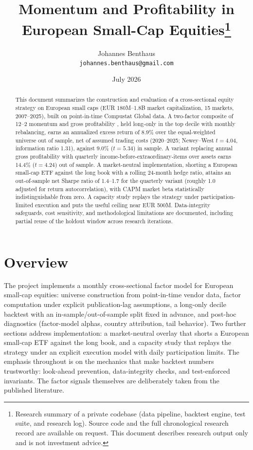 \documentclass[11pt,a4paper]{article}
\title{Momentum and Profitability in European Small-Cap
Equities\thanks{Research
summary of a private codebase (data pipeline, backtest engine, test suite,
and research log). Source code and the full chronological research record
are available on request. This document describes research output only and
is not investment advice.}}
\author{Johannes Benthaus\\
  \small\texttt{johannes.benthaus@gmail.com}}
\date{July 2026}
\begin{document}
\maketitle

\begin{abstract}
\noindent
This document summarizes the construction and evaluation of a cross-sectional
equity strategy on European small caps (EUR 180M--1.8B market capitalization,
15 markets, 2007--2025), built on point-in-time Compustat Global data. A
two-factor composite of 12--2 momentum and gross profitability
\citep[cf.][]{jegadeesh1993,novymarx2013}, held long-only in the top decile
with monthly rebalancing, earns an annualized excess return of 8.9\% over the
equal-weighted universe out of sample, net of assumed trading costs
(2020--2025; Newey--West $t = 4.04$,
information ratio 1.31), against 9.0\% ($t = 5.34$) in sample. A variant
replacing annual gross profitability with quarterly income-before-extraordinary-items
over assets earns 14.4\% ($t = 4.24$) out of sample. A market-neutral
implementation, shorting a European small-cap ETF against the long book with a
rolling 24-month hedge ratio, attains an out-of-sample net Sharpe ratio of
1.4--1.7 for the quarterly variant (roughly 1.0 adjusted for return
autocorrelation), with CAPM market beta statistically
indistinguishable from zero. A capacity study replays the strategy under
participation-limited execution and puts the useful ceiling near EUR 500M.
Data-integrity safeguards, cost sensitivity, and methodological limitations
are documented, including partial reuse of the holdout window across research
iterations.
\end{abstract}

\section{Overview}

The project implements a monthly cross-sectional factor model for European
small-cap equities: universe construction from point-in-time vendor data,
factor computation under explicit publication-lag assumptions, a long-only
decile backtest with an in-sample/out-of-sample split fixed in advance, and
post-hoc diagnostics (factor-model alphas, country attribution, tail
behavior). Two further sections address implementation: a market-neutral
overlay that shorts a European small-cap ETF against the long book, and a
capacity study that replays the strategy under an explicit execution model
with daily participation limits. The emphasis throughout is on the mechanics
that make backtest numbers trustworthy: look-ahead prevention,
data-integrity checks, and test-enforced invariants. The factor signals
themselves are deliberately taken from the published literature.
\end{document}

